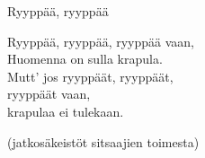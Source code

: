 \begin{song}{Ryyppää, ryyppää}

    Ryyppää, ryyppää, ryyppää vaan,\\
    Huomenna on sulla krapula.\\
    Mutt’ jos ryyppäät, ryyppäät,\\
    ryyppäät vaan,\\
    krapulaa ei tulekaan.

    (jatkosäkeistöt sitsaajien toimesta)

\end{song}